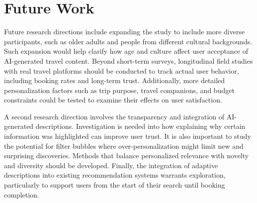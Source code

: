 \section{Future Work}
Future research directions include expanding the study to include more diverse participants, such as older adults and people from different cultural backgrounds. Such expansion would help clarify how age and culture affect user acceptance of AI-generated travel content. Beyond short-term surveys, longitudinal field studies with real travel platforms should be conducted to track actual user behavior, including booking rates and long-term trust. Additionally, more detailed personalization factors such as trip purpose, travel companions, and budget constraints could be tested to examine their effects on user satisfaction.

A second research direction involves the transparency and integration of AI-generated descriptions. Investigation is needed into how explaining why certain information was highlighted can improve user trust. It is also important to study the potential for filter bubbles where over-personalization might limit new and surprising discoveries. Methods that balance personalized relevance with novelty and diversity should be developed. Finally, the integration of adaptive descriptions into existing recommendation systems warrants exploration, particularly to support users from the start of their search until booking completion.






